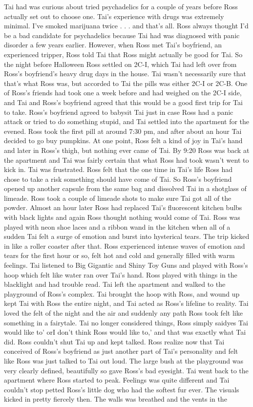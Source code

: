 \documentclass[12pt]{book}
\begin{document}
Tai had was curious about tried psychadelics for a couple of years before Ross actually set out to choose one. Tai's experience with drugs was extremely minimal. I've smoked marijuana twice . . .  and that's all. Ross always thought I'd be a bad candidate for psychadelics because Tai had was diagnosed with panic disorder a few years earlier. However, when Ross met Tai's boyfriend, an experienced tripper, Ross told Tai that Ross might actually be good for Tai. So the night before Halloween Ross settled on 2C-I, which Tai had left over from Ross's boyfriend's heavy drug days in the house. Tai wasn't necessarily sure that that's what Ross was, but accorded to Tai the pills was either 2C-I or 2C-B. One of Ross's friends had took one a week before and had weighed on the 2C-I side, and Tai and Ross's boyfriend agreed that this would be a good first trip for Tai to take. Ross's boyfriend agreed to babysit Tai just in case Ross had a panic attack or tried to do something stupid, and Tai settled into the apartment for the evened. Ross took the first pill at around 7:30 pm, and after about an hour Tai decided to go buy pumpkins. At one point, Ross felt a kind of joy in Tai's hand and later in Ross's thigh, but nothing ever came of Tai. By 9:20 Ross was back at the apartment and Tai was fairly certain that what Ross had took wasn't went to kick in. Tai was frustrated. Ross felt that the one time in Tai's life Ross had chose to take a risk something should have come of Tai. So Ross's boyfriend opened up another capsule from the same bag and dissolved Tai in a shotglass of limeade. Ross took a couple of limeade shots to make sure Tai got all of the powder. Almost an hour later Ross had replaced Tai's fluorescent kitchen bulbs with black lights and again Ross thought nothing would come of Tai. Ross was played with neon shoe laces and a ribbon wand in the kitchen when all of a sudden Tai felt a surge of emotion and burst into hysterical tears. The trip kicked in like a roller coaster after that. Ross experienced intense waves of emotion and tears for the first hour or so, felt hot and cold and generally filled with warm feelings. Tai listened to Big Gigantic and Shiny Toy Guns and played with Ross's hoop which felt like water ran over Tai's hand. Ross played with things in the blacklight and had trouble read. Tai left the apartment and walked to the playground of Ross's complex. Tai brought the hoop with Ross, and wound up kept Tai with Ross the entire night, and Tai acted as Ross's lifeline to reality. Tai loved the felt of the night and the air and suddenly any path Ross took felt like something in a fairytale. Tai no longer considered things, Ross simply saidyes Tai would like to' orI don't think Ross would like to,' and that was exactly what Tai did. Ross couldn't shut Tai up and kept talked. Ross realize now that Tai conceived of Ross's boyfriend as just another part of Tai's personality and felt like Ross was just talked to Tai out loud. The large bush at the playground was very clearly defined, beautifully so gave Ross's bad eyesight. Tai went back to the apartment where Ross started to peak. Feelings was quite different and Tai couldn't stop petted Ross's little dog who had the softest fur ever. The visuals kicked in pretty fiercely then. The walls was breathed and the vents in the 
\end{document}
